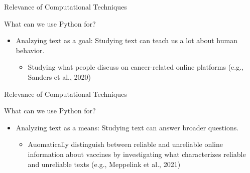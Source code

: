 \documentclass[compress]{beamer}
\begin{document}
\begin{frame}[fragile]{Relevance of Computational Techniques}
	
	\begin{alertblock}{What can we use Python for?}	
		\begin{itemize}
			\item Analzying text as a goal: Studying text can teach us a lot about human behavior.  
			\begin{itemize}
				\item Studying what people discuss on cancer-related online platforms (\tiny{e.g., Sanders et al., 2020})
			\end{itemize}
		\end{itemize}
	\end{alertblock}
\end{frame}

\begin{frame}[fragile]{Relevance of Computational Techniques}
	
\begin{alertblock}{What can we use Python for?}	
\begin{itemize}
	\item Analyzing text as a means: Studying text can answer broader questions.
	\begin{itemize}
		\item Auomatically distinguish between reliable and unreliable online information about vaccines 
		by investigating what characterizes reliable and unreliable texts (\tiny{e.g., Meppelink et al., 2021})
	\end{itemize}
\end{itemize}
\end{alertblock}
\end{frame}
\end{document}
